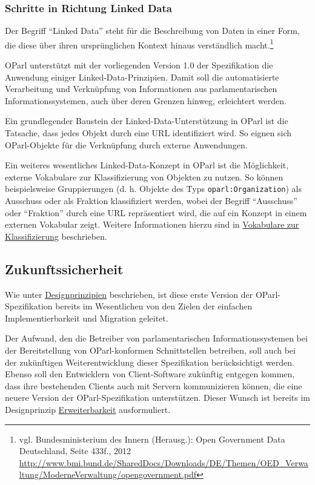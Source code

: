 \documentclass[,a4paper]{article}
\begin{document}
\subsubsection{Schritte in Richtung Linked Data}\label{linkedux5fdata}

Der Begriff ``Linked Data'' steht für die Beschreibung von Daten in
einer Form, die diese über ihren ursprünglichen Kontext hinaus
verständlich macht.\footnote{vgl. Bundesministerium des Innern
  (Herausg.): Open Government Data Deutschland, Seite 433f., 2012
  \url{http://www.bmi.bund.de/SharedDocs/Downloads/DE/Themen/OED_Verwaltung/ModerneVerwaltung/opengovernment.pdf}}

OParl unterstützt mit der vorliegenden Version 1.0 der Spezifikation die
Anwendung einiger Linked-Data-Prinzipien. Damit soll die automatisierte
Verarbeitung und Verknüpfung von Informationen aus parlamentarischen
Informationssystemen, auch über deren Grenzen hinweg, erleichtert
werden.

Ein grundlegender Baustein der Linked-Data-Unterstützung in OParl ist
die Tatsache, dass jedes Objekt durch eine URL identifiziert wird. So
eignen sich OParl-Objekte für die Verknüpfung durch externe Anwendungen.

Ein weiteres wesentliches Linked-Data-Konzept in OParl ist die
Möglichkeit, externe Vokabulare zur Klassifizierung von Objekten zu
nutzen. So können beispielsweise Gruppierungen (d. h. Objekte des Typs
\texttt{oparl:Organization}) als Ausschuss oder als Fraktion
klassifiziert werden, wobei der Begriff ``Ausschuss'' oder ``Fraktion''
durch eine URL repräsentiert wird, die auf ein Konzept in einem externen
Vokabular zeigt. Weitere Informationen hierzu sind in
\hyperref[vokabulareux5fklassifizierung]{Vokabulare zur Klassifizierung}
beschrieben.

\subsection{Zukunftssicherheit}\label{zukunftssicherheit}

Wie unter \hyperref[designprinzipien]{Designprinzipien} beschrieben, ist
diese erste Version der OParl-Spezifikation bereits im Wesentlichen von
den Zielen der einfachen Implementierbarkeit und Migration geleitet.

Der Aufwand, den die Betreiber von parlamentarischen
Informationssystemen bei der Bereitstellung von OParl-konformen
Schnittstellen betreiben, soll auch bei der zukünftigen
Weiterentwicklung dieser Spezifikation berücksichtigt werden. Ebenso
soll den Entwicklern von Client-Software zukünftig entgegen kommen, dass
ihre bestehenden Clients auch mit Servern kommunizieren können, die eine
neuere Version der OParl-Spezifikation unterstützen. Dieser Wunsch ist
bereits im Designprinzip \hyperref[erweiterbarkeit]{Erweiterbarkeit}
ausformuliert.
\end{document}
